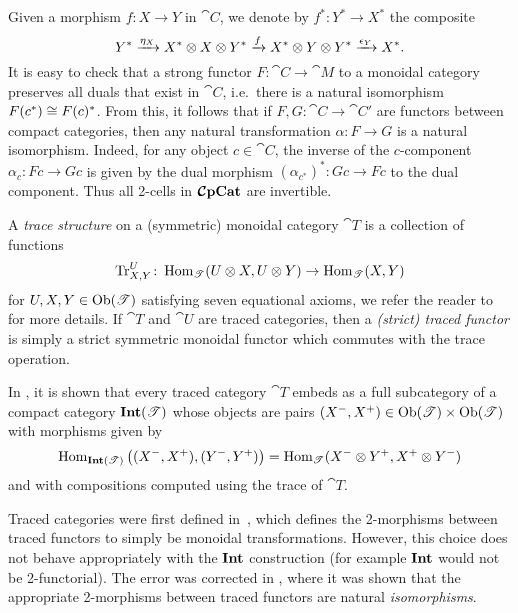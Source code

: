 \documentclass[11pt,oneside,article]{memoir}
\begin{document}
Given a morphism $f\colon X\to Y$ in $\cat{C}$, we denote by $f^*\colon Y^*\to X^*$ the composite
\begin{equation*}
  Y^*\xrightarrow{\eta_X}X^*\otimes X\otimes Y^* \xrightarrow{f}X^*\otimes Y\otimes Y^*\xrightarrow{\epsilon_Y}X^*.
\end{equation*}
It is easy to check that a strong functor $F\colon\cat{C}\to\cat{M}$ to a monoidal category
preserves all duals that exist in $\cat{C}$, i.e.\ there is a natural isomorphism $F(c^*)\cong
F(c)^*$. From this, it follows that if $F,G\colon\cat{C}\to\cat{C'}$ are functors between compact
categories, then any natural transformation $\alpha\colon F\to G$ is a natural isomorphism. Indeed,
for any object $c\in\cat{C}$, the inverse of the $c$-component $\alpha_c\colon Fc\to Gc$ is given by
the dual morphism $(\alpha_{c^*})^*\colon Gc\to Fc$ to the dual component. Thus all 2-cells in
$\bm{\mathcal{C}}\mathbf{pCat}$ are invertible.

A \emph{trace structure} on a (symmetric) monoidal category $\cat{T}$ is a collection of functions
\begin{equation}
    \label{dia:trace_function}
  \operatorname{Tr}^U_{X,Y}\colon\operatorname{Hom}_{\mathscr{T}}(U\otimes X,U\otimes Y)\to\operatorname{Hom}_{\mathscr{T}}(X,Y)
\end{equation}
for $U,X,Y\in\mathrm{Ob}(\mathscr{T})$ satisfying seven equational axioms, we refer the reader to
\cite{JoyalStreetVerity} for more details. If $\cat{T}$ and $\cat{U}$ are traced categories, then a
\emph{(strict) traced functor} is simply a strict symmetric monoidal functor which commutes with the
trace operation.

In \cite{JoyalStreetVerity}, it is shown that every traced category $\cat{T}$ embeds as a full
subcategory of a compact category $\mathbf{Int}(\mathscr{T})$ whose objects are pairs
$(X^-,X^+)\in\mathrm{Ob}(\mathscr{T})\times\mathrm{Ob}(\mathscr{T})$ with morphisms given by
\begin{equation*}
  \operatorname{Hom}_{\mathbf{Int}(\mathscr{T})}\big((X^-,X^+),(Y^-,Y^+)\big)
    = \operatorname{Hom}_{\mathscr{T}}(X^-\otimes Y^+,X^+\otimes Y^-)
\end{equation*}
and with compositions computed using the trace of $\cat{T}$.

\begin{remark}
    \label{rem:traced_2morphisms}
  Traced categories were first defined in~\cite{JoyalStreetVerity}, which defines the 2-morphisms
  between traced functors to simply be monoidal transformations. However, this choice does not
  behave appropriately with the $\mathbf{Int}$ construction (for example $\mathbf{Int}$ would not be 2-functorial).
  The error was corrected in \cite{HK}, where it was shown that the appropriate 2-morphisms between
  traced functors are natural \emph{isomorphisms}.
\end{remark}
\end{document}

